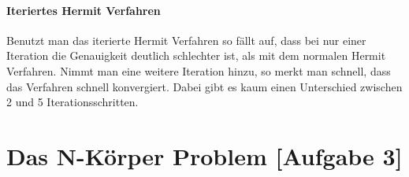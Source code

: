 \paragraph{Iteriertes Hermit Verfahren}
Benutzt man das iterierte Hermit Verfahren so fällt auf,
dass bei nur einer Iteration die Genauigkeit deutlich schlechter ist, als mit dem normalen Hermit Verfahren.
Nimmt man eine weitere Iteration hinzu, so merkt man schnell, dass das Verfahren schnell konvergiert.
Dabei gibt es kaum einen Unterschied zwischen 2 und 5 Iterationsschritten.


\section{Das N-Körper Problem [Aufgabe 3]}